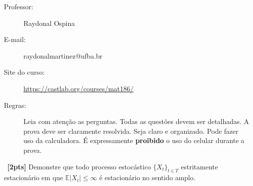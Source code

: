 \documentclass[a4paper,12pt,oneside,twocolumn]{Config/milktest}
\begin{document}
\beb
{
\begin{description}
\item[Professor:] Raydonal Ospina
\item[E-mail:] raydonalmartinez@ufba.br
\item[Site do curso:] \url{https://castlab.org/courses/mat186/}

\item[Regras:] Leia com atenção as perguntas. Todas as questões devem ser detalhadas. A prova deve ser claramente resolvida. Seja claro e organizado. Pode fazer uso da calculadora. É expressamente {\bf proibido} o uso do celular durante a prova.

 \end{description}
}
\eeb

\balance


\medskip 
\question~\textbf{[2pts]}  
Demonstre que todo processo estocástico $\{X_t\}_{t\in T}$ estritamente estacionário em que $\mathbb{E}|X_t|\leq \infty$ é estacionário  no sentido amplo. 


\end{document}
